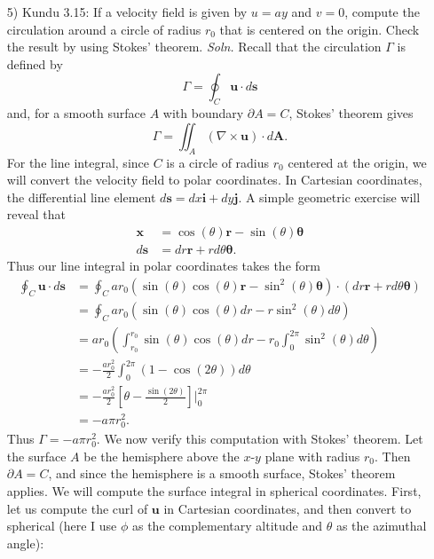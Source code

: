 \documentclass{article}
\begin{document}
\begin{itemize}
    \pagebreak
    \item[5)] Kundu 3.15: If a velocity field is given by $u = ay$ and $v = 0$, compute the circulation around a circle of radius $r_0$ that is centered on the origin. Check the result by using Stokes' theorem.
    \newline\newline
    \textit{Soln.} Recall that the circulation $\Gamma$ is defined by
    \[\Gamma = \oint_C \mathbf{u}\cdot d\mathbf{s}\]
    and, for a smooth surface $A$ with boundary $\partial A = C$, Stokes' theorem gives
    \[\Gamma = \iint_A(\nabla\times \mathbf{u})\cdot d\mathbf{A}.\]
    For the line integral, since $C$ is a circle of radius $r_0$ centered at the origin, we will convert the velocity field to polar coordinates. In Cartesian coordinates, the differential line element $d\mathbf{s} = dx\mathbf{i} + dy \mathbf{j}$. A simple geometric exercise will reveal that
    \begin{align*}
        \mathbf{x} &= \cos(\theta)\mathbf{r} - \sin(\theta)\bm{\theta}\\
        d\mathbf{s} &= dr\mathbf{r} + rd\theta\bm{\theta}.
    \end{align*}
    Thus our line integral in polar coordinates takes the form
    \begin{align*}
        \oint_C\mathbf{u}\cdot d\mathbf{s} &= \oint_C ar_0(\sin(\theta)\cos(\theta)\mathbf{r} - \sin^2(\theta)\bm{\theta})\cdot(dr\mathbf{r} + rd\theta\bm{\theta})\\
        &= \oint_Car_0(\sin(\theta)\cos(\theta)dr - r\sin^2(\theta)d\theta)\\
        &= ar_0\left(\int_{r_0}^{r_0}\sin(\theta)\cos(\theta)dr - r_0\int_0^{2\pi}\sin^2(\theta)d\theta\right)\\
        &= -\frac{ar_0^2}{2}\int_0^{2\pi}(1 - \cos(2\theta))d\theta\\
        &= -\frac{ar_0^2}{2}\left[\theta - \frac{\sin(2\theta)}{2}\right]\bigg|_0^{2\pi}\\
        &= -a\pi r_0^2.
    \end{align*}
    Thus $\Gamma = -a\pi r_0^2$. We now verify this computation with Stokes' theorem. Let the surface $A$ be the hemisphere above the $x$-$y$ plane with radius $r_0$. Then $\partial A = C$, and since the hemisphere is a smooth surface, Stokes' theorem applies. We will compute the surface integral in spherical coordinates. First, let us compute the curl of $\mathbf{u}$ in Cartesian coordinates, and then convert to spherical (here I use $\phi$ as the complementary altitude and $\theta$ as the azimuthal angle):

\end{itemize}
\end{document}

